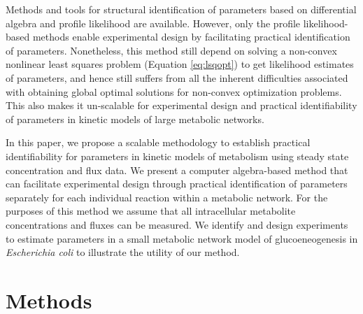 \documentclass[10pt]{article}
\begin{document}
	Methods and tools for structural identification of parameters based on differential algebra \parencite{Ljung1994, Audoly2001, Bellu2007} and profile likelihood \parencite{Raue2009a} are available. However, only the profile likelihood-based methods enable experimental design by facilitating practical identification of parameters. Nonetheless, this method still depend on solving a non-convex nonlinear least squares problem (Equation \ref{eq:lsqopt}) to get likelihood estimates of parameters, and hence still suffers from all the inherent difficulties associated with obtaining global optimal solutions for non-convex optimization problems. This also makes it un-scalable for experimental design and practical identifiability of parameters in kinetic models of large metabolic networks.
	
	In this paper, we propose a scalable methodology to establish practical identifiability for parameters in kinetic models of metabolism using steady state concentration and flux data. We present a computer algebra-based method that can facilitate experimental design through practical identification of parameters separately for each individual reaction within a metabolic network. For the purposes of this method we assume that all intracellular metabolite concentrations and fluxes can be measured. We identify and design experiments to estimate parameters in a small metabolic network model of glucoeneogenesis in \textit{Escherichia coli} \parencite{Kotte2014, Srinivasan2017} to illustrate the utility of our method.  %
	
	\section{Methods}\label{sec:methods}
\end{document}

